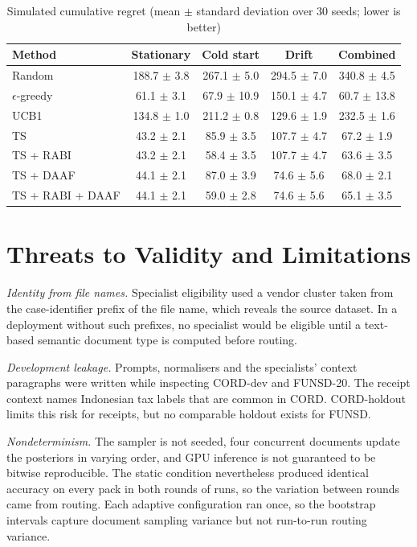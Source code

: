 \documentclass[conference,a4paper]{IEEEtran}
\begin{document}
\begin{table}[t]
\caption{Simulated cumulative regret (mean $\pm$ standard deviation over 30 seeds; lower is better)}
\label{tab:sim}
\centering
\scriptsize
\setlength{\tabcolsep}{2.5pt}
\begin{tabular}{lcccc}
\toprule
Method & Stationary & Cold start & Drift & Combined\\
\midrule
Random & 188.7 $\pm$ 3.8 & 267.1 $\pm$ 5.0 & 294.5 $\pm$ 7.0 & 340.8 $\pm$ 4.5\\
$\epsilon$-greedy & 61.1 $\pm$ 3.1 & 67.9 $\pm$ 10.9 & 150.1 $\pm$ 4.7 & 60.7 $\pm$ 13.8\\
UCB1 & 134.8 $\pm$ 1.0 & 211.2 $\pm$ 0.8 & 129.6 $\pm$ 1.9 & 232.5 $\pm$ 1.6\\
TS & 43.2 $\pm$ 2.1 & 85.9 $\pm$ 3.5 & 107.7 $\pm$ 4.7 & 67.2 $\pm$ 1.9\\
TS + RABI & 43.2 $\pm$ 2.1 & 58.4 $\pm$ 3.5 & 107.7 $\pm$ 4.7 & 63.6 $\pm$ 3.5\\
TS + DAAF & 44.1 $\pm$ 2.1 & 87.0 $\pm$ 3.9 & 74.6 $\pm$ 5.6 & 68.0 $\pm$ 2.1\\
TS + RABI + DAAF & 44.1 $\pm$ 2.1 & 59.0 $\pm$ 2.8 & 74.6 $\pm$ 5.6 & 65.1 $\pm$ 3.5\\
\bottomrule
\end{tabular}
\end{table}

\section{Threats to Validity and Limitations}
\label{sec:threats}

\textit{Identity from file names.} Specialist eligibility used a vendor cluster taken from the case-identifier prefix of the file name, which reveals the source dataset. In a deployment without such prefixes, no specialist would be eligible until a text-based semantic document type is computed before routing.

\textit{Development leakage.} Prompts, normalisers and the specialists' context paragraphs were written while inspecting CORD-dev and FUNSD-20. The receipt context names Indonesian tax labels that are common in CORD. CORD-holdout limits this risk for receipts, but no comparable holdout exists for FUNSD.

\textit{Nondeterminism.} The sampler is not seeded, four concurrent documents update the posteriors in varying order, and GPU inference is not guaranteed to be bitwise reproducible. The static condition nevertheless produced identical accuracy on every pack in both rounds of runs, so the variation between rounds came from routing. Each adaptive configuration ran once, so the bootstrap intervals capture document sampling variance but not run-to-run routing variance.
\end{document}
